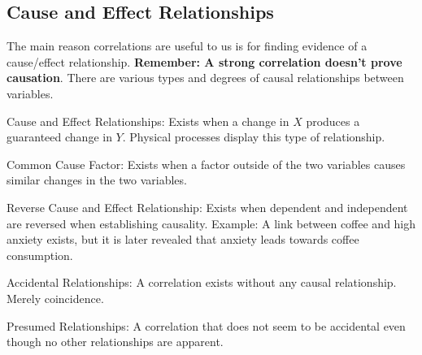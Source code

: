     \subsection{Cause and Effect Relationships}
    The main reason correlations are useful to us is for finding evidence of a cause/effect relationship.
    \textbf{Remember: A strong correlation doesn't prove causation}. 
    There are various types and degrees of causal relationships between variables. 
    \begin{definition}
        Cause and Effect Relationships: Exists when a change in $X$ produces a guaranteed change in $Y$.
        Physical processes display this type of relationship.
    \end{definition}
    \begin{definition}
        Common Cause Factor: Exists when a factor outside of the two variables causes similar changes in the two variables. 
    \end{definition}
    \begin{definition}
        Reverse Cause and Effect Relationship: Exists when dependent and independent are reversed when establishing causality. Example: A link between coffee and high anxiety exists, but it is later revealed that anxiety leads towards coffee consumption. 
    \end{definition}
    \begin{definition}
        Accidental Relationships: A correlation exists without any causal relationship. Merely coincidence. 
    \end{definition}
    \begin{definition}
        Presumed Relationships: A correlation that does not seem to be accidental even though no other relationships are apparent. 
    \end{definition}